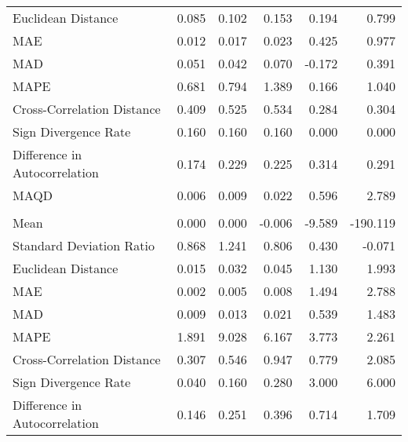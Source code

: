 \begin{landscape}
\begin{ThreePartTable}
\begin{longtable}[t]{lrrrrr}
\hspace{1em}Euclidean Distance & 0.085 & 0.102 & 0.153 & 0.194 & 0.799\\
\hspace{1em}MAE & 0.012 & 0.017 & 0.023 & 0.425 & 0.977\\
\hspace{1em}MAD & 0.051 & 0.042 & 0.070 & -0.172 & 0.391\\
\hspace{1em}MAPE & 0.681 & 0.794 & 1.389 & 0.166 & 1.040\\
\hspace{1em}Cross-Correlation Distance & 0.409 & 0.525 & 0.534 & 0.284 & 0.304\\
\hspace{1em}Sign Divergence Rate & 0.160 & 0.160 & 0.160 & 0.000 & 0.000\\
\hspace{1em}Difference in Autocorrelation & 0.174 & 0.229 & 0.225 & 0.314 & 0.291\\
\hspace{1em}MAQD & 0.006 & 0.009 & 0.022 & 0.596 & 2.789\\
\addlinespace[0.5em]
\multicolumn{6}{l}{\textbf{CAN}}\\
\hline
\hspace{1em}Mean & 0.000 & 0.000 & -0.006 & -9.589 & -190.119\\
\hspace{1em}Standard Deviation Ratio & 0.868 & 1.241 & 0.806 & 0.430 & -0.071\\
\hspace{1em}Euclidean Distance & 0.015 & 0.032 & 0.045 & 1.130 & 1.993\\
\hspace{1em}MAE & 0.002 & 0.005 & 0.008 & 1.494 & 2.788\\
\hspace{1em}MAD & 0.009 & 0.013 & 0.021 & 0.539 & 1.483\\
\hspace{1em}MAPE & 1.891 & 9.028 & 6.167 & 3.773 & 2.261\\
\hspace{1em}Cross-Correlation Distance & 0.307 & 0.546 & 0.947 & 0.779 & 2.085\\
\hspace{1em}Sign Divergence Rate & 0.040 & 0.160 & 0.280 & 3.000 & \vphantom{1} 6.000\\
\hspace{1em}Difference in Autocorrelation & 0.146 & 0.251 & 0.396 & 0.714 & 1.709\\

\end{longtable}
\end{ThreePartTable}
\end{landscape}

